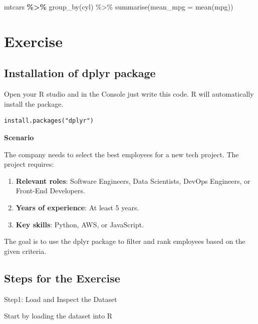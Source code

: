 \documentclass[
  11pt,
  a4paper]{article}
\begin{document}
mtcars \textbf{\%\textgreater\%} group\_by(cyl) \%\textgreater\%
summarise(mean\_mpg = mean(mpg))

\section{Exercise}\label{exercise}

\subsection{\texorpdfstring{\textbf{Installation of dplyr
package}}{Installation of dplyr package}}\label{installation-of-dplyr-package}

Open your R studio and in the Console just write this code. R will
automatically install the package.

\begin{verbatim}
install.packages("dplyr")
\end{verbatim}

\textbf{Scenario}

The company needs to select the best employees for a new tech project.
The project requires:

\begin{enumerate}
\def\labelenumi{\arabic{enumi}.}
\item
  \textbf{Relevant roles}: Software Engineers, Data Scientists, DevOps
  Engineers, or Front-End Developers.
\item
  \textbf{Years of experience}: At least 5 years.
\item
  \textbf{Key skills}: Python, AWS, or JavaScript.
\end{enumerate}

The goal is to use the dplyr package to filter and rank employees based
on the given criteria.

\subsection{Steps for the Exercise}\label{steps-for-the-exercise}

Step1: Load and Inspect the Dataset

Start by loading the dataset into R
\end{document}
